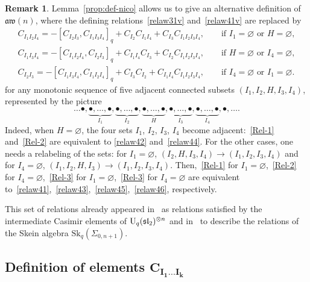 \documentclass[10pt,a4paper]{amsart}
\numberwithin{equation}{section}
\theoremstyle{definition}
\newtheorem{rema}[theo]{Remark}
\newcommand{\aw}{\mathfrak{aw}(n)}
\begin{document}
\begin{rema}%
Lemma~\ref{prop:def-nico} allows us to give an alternative definition of $\aw$, where the defining relations~\eqref{relaw31v} and~\eqref{relaw41v}
are replaced by
 \begin{subequations}
\begin{gather}
C_{I_1I_2I_4}=- [C_{I_2I_3},C_{I_1I_3I_4}]_q + C_{I_2}C_{I_1I_4}+C_{I_3}C_{I_1I_2I_3I_4} , \qquad\text{if $I_1=\varnothing$ or $H=\varnothing$} ,\label{Rel-1}\\
C_{I_1I_3I_4}=-[C_{I_1I_2I_4},C_{I_2I_3}]_q +C_{I_1I_4}C_{I_3}+C_{I_2}C_{I_1I_2I_3I_4} ,\qquad\text{if $H=\varnothing$ or $I_4=\varnothing$} ,\label{Rel-2}\\
C_{I_2I_3}=-[C_{I_1I_3I_4},C_{I_1I_2I_4}]_q + C_{I_3}C_{I_2}+C_{I_1I_4}C_{I_1I_2I_3I_4} ,\qquad\text{if $I_4=\varnothing$ or $I_1=\varnothing$}.\label{Rel-3}
\end{gather}
 \end{subequations}
for any monotonic sequence of five adjacent connected subsets $(I_1,I_2,H,I_3,I_4)$, represented by the picture
\[\ldots \bullet,\underbrace{\bullet,\dots,\bullet}_{I_1},\underbrace{\bullet,\dots,\bullet}_{I_2},\underbrace{\bullet,\dots,\bullet}_{H},
\underbrace{\bullet,\dots,\bullet}_{I_3},\underbrace{\bullet,\dots,\bullet}_{I_4},\bullet,\ldots .\]
Indeed, when $H=\varnothing$, the four sets $I_1$, $I_2$, $I_3$, $I_4$ become adjacent:~\eqref{Rel-1} and~\eqref{Rel-2} are equivalent to
\eqref{relaw42} and~\eqref{relaw44}. For the other cases, one needs a relabeling of the sets: for $I_1=\varnothing$,
$(I_2,H,I_3,I_4)\to(I_1,I_2,I_3,I_4)$ and for $I_4=\varnothing$,
$(I_1,I_2,H,I_3)\to(I_1,I_2,I_3,I_4)$. Then,~\eqref{Rel-1} for $I_1=\varnothing$,~\eqref{Rel-2} for $I_4=\varnothing$,~\eqref{Rel-3} for $I_1=\varnothing$,~\eqref{Rel-3} for $I_4=\varnothing$ are equivalent to~\eqref{relaw41},~\eqref{relaw43},~\eqref{relaw45},~\eqref{relaw46}, respectively.

This set of relations already appeared in~\cite{DeC} as relations satisfied by the intermediate Casimir elements of ${\rm U}_q(\mathfrak{sl}_2)^{\otimes n}$ and in~\cite{CL} to describe the relations
of the Skein algebra $\text{Sk}_q(\Sigma_{0,n+1})$.
\end{rema}

\subsection[Definition of elements C\_\{I\_1\dots I\_k\}]{Definition of elements $\boldsymbol{C_{I_1\dots I_k}}$}%
\end{document}
